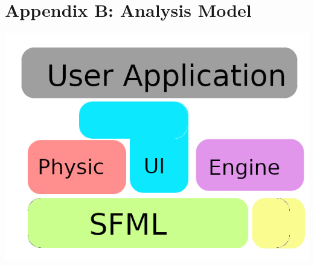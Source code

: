 \documentclass{scrreprt}
\begin{document}




\section{Appendix B: Analysis Model}
\includegraphics[width=0.8\linewidth]{model}
\end{document}
